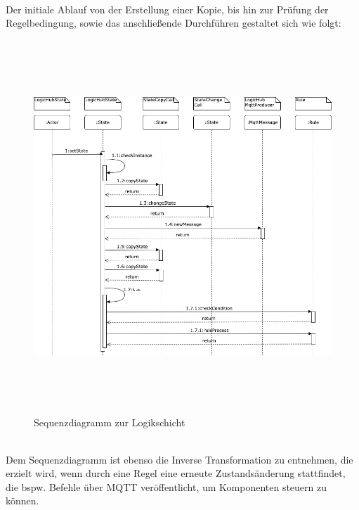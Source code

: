     \\
    Der initiale Ablauf von der Erstellung einer Kopie, bis hin zur Prüfung der Regelbedingung, sowie das anschließende Durchführen gestaltet sich wie folgt: 
    \\
    \pagebreak
    \begin{figure}[hbt!]
        \centering
        \includegraphics[width=14cm,height=14cm,keepaspectratio]{images/Logikschicht_Sequenz_final.png}
        \caption{Sequenzdiagramm zur Logikschicht}
        \label{fig:logiksequenz}
    \end{figure}
    \\
    \linebreak
    Dem Sequenzdiagramm ist ebenso die Inverse Transformation zu entnehmen, die erzielt wird, wenn durch eine Regel eine erneute Zustandsänderung stattfindet, die bspw. Befehle über \acs{MQTT} 
    veröffentlicht, um Komponenten steuern zu können. 

